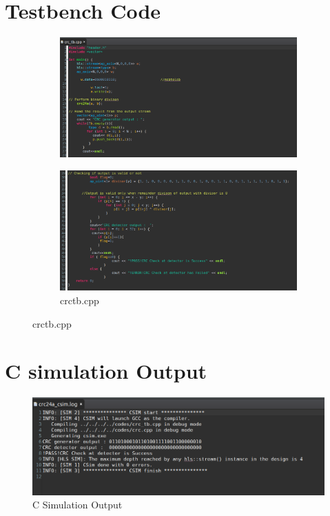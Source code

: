 \documentclass{article}
\begin{document}
\section{Testbench Code}
\vspace{1cm}
\begin{figure}[h]
\centering
\begin{subfigure}[b]{\textwidth}
    \centering
\includegraphics[width=1.1\textwidth]{figs/p1crc_tb1.png}
    \label{fig:my_label}
\end{subfigure}
\hfill
\begin{subfigure}[b]{\textwidth}
    \centering
\includegraphics[width=1.1\textwidth]{figs/p1crc_tb2.png}
    \caption{crctb.cpp}
    \label{fig:my_label}
\end{subfigure}
\end{figure}
\vspace{10cm}

\section{C simulation Output}

\begin{figure}[h]
\centering
\includegraphics[width=1.1\textwidth]{figs/p1csim.png}
    \caption{C Simulation Output}
    \label{fig:my_label}
\end{figure}
\vspace{1cm}
\end{document}
